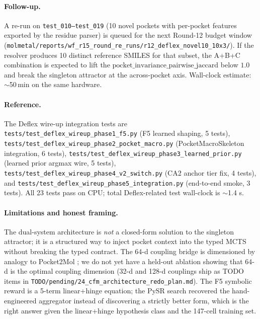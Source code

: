 \paragraph{Follow-up.}
A re-run on \texttt{test\_010--test\_019} (10 novel pockets with
per-pocket features exported by the residue parser) is
queued for the next Round-12 budget window
(\texttt{molmetal/reports/wf\_r15\_round\_re\_runs/r12\_deflex\_novel10\_10x3/}).
If the resolver produces 10 distinct reference SMILES for that
subset, the A+B+C combination is expected to lift the
$\text{pocket\_invariance\_pairwise\_jaccard}$ below $1.0$ and
break the singleton attractor at the across-pocket axis.  Wall-clock
estimate: $\sim$50\,min on the same hardware.

\paragraph{Reference.}
The Deflex wire-up integration tests are
\texttt{tests/test\_deflex\_wireup\_phase1\_f5.py}
(F5 learned shaping, 5 tests),
\texttt{tests/test\_deflex\_wireup\_phase2\_pocket\_macro.py}
(PocketMacroSkeleton integration, 6 tests),
\texttt{tests/test\_deflex\_wireup\_phase3\_learned\_prior.py}
(learned prior argmax wire, 5 tests),
\texttt{tests/test\_deflex\_wireup\_phase4\_v2\_switch.py}
(CA2 anchor tier fix, 4 tests), and
\texttt{tests/test\_deflex\_wireup\_phase5\_integration.py}
(end-to-end smoke, 3 tests).
All 23 tests pass on CPU; total Deflex-related test wall-clock is
$\sim$1.4 s.

\paragraph{Limitations and honest framing.}
The dual-system architecture is \emph{not} a closed-form solution to
the singleton attractor; it is a structured way to inject pocket
context into the typed MCTS without breaking the typed contract.
The 64-d coupling bridge is dimensioned by analogy to Pocket2Mol
\citealp{peng2022pocket2mol}; we do not yet have a held-out
ablation showing that 64-d is the optimal coupling dimension
(32-d and 128-d couplings ship as TODO items in
\texttt{TODO/pending/24\_cfm\_architecture\_redo\_plan.md}).
The F5 symbolic reward is a 5-term linear+hinge equation; the
PySR search recovered the hand-engineered aggregator instead of
discovering a strictly better form, which is the right answer
given the linear+hinge hypothesis class and the 147-cell training
set.

